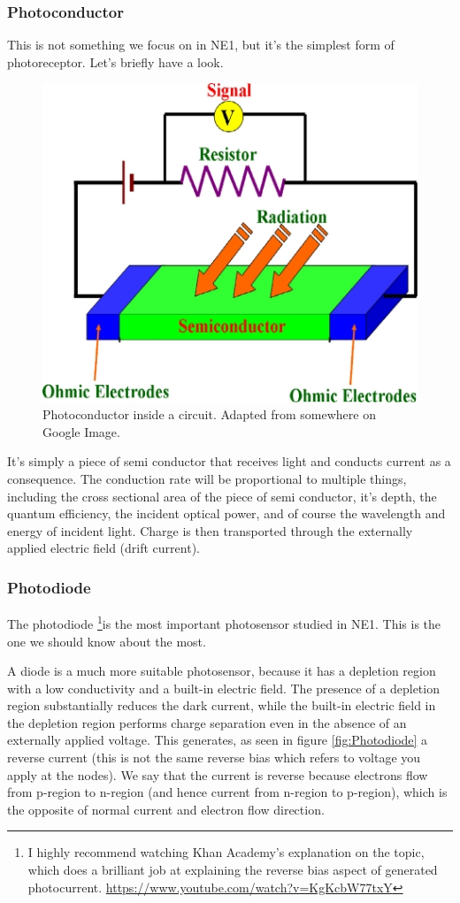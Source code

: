 \subsubsection{Photoconductor}

This is not something we focus on in NE1, but it's the simplest form of photoreceptor. Let's briefly have a look. 

\begin{figure}[H]
    \centering
    \includegraphics[width=0.5\linewidth]{../../Figures/Photoconductor.PNG}
    \caption{Photoconductor inside a circuit. Adapted from somewhere on Google Image.}
    \label{fig:Photoconductor}
\end{figure}

It's simply a piece of semi conductor that receives light and conducts current as a consequence. The conduction rate will be proportional to multiple things, including the cross sectional area of the piece of semi conductor, it's depth, the quantum efficiency, the incident optical power, and of course the wavelength and energy of incident light. Charge is then transported through the externally applied electric field (drift current). 

\subsubsection{Photodiode}

The photodiode \footnote{I highly recommend watching Khan Academy's explanation on the topic, which does a brilliant job at explaining the reverse bias aspect of generated photocurrent. \url{https://www.youtube.com/watch?v=KgKcbW77txY}}is the most important photosensor studied in NE1. This is the one we should know about the most. 

A diode is a much more suitable photosensor, because it has a depletion region with a low conductivity and a built-in electric field. The presence of a depletion region substantially reduces the dark current, while the built-in electric field in the depletion region performs charge separation even in the absence of an externally applied voltage. This generates, as seen in figure \ref{fig:Photodiode} a reverse current (this is not the same reverse bias which refers to voltage you apply at the nodes). We say that the current is reverse because electrons flow from p-region to n-region (and hence current from n-region to p-region), which is the opposite of normal current and electron flow direction. 

